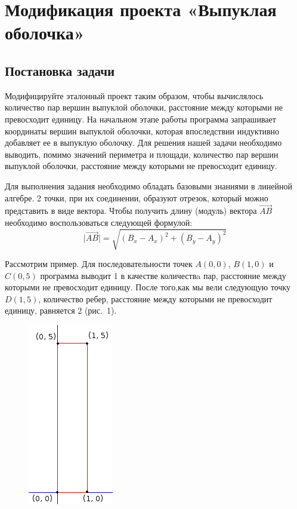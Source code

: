 \section{Модификация проекта «Выпуклая оболочка»}

\subsection{Постановка задачи}

Модифицируйте эталонный проект таким образом, чтобы вычислялось количество пар вершин выпуклой оболочки, расстояние между которыми не превосходит единицу.
На начальном этапе работы программа запрашивает координаты вершин выпуклой оболочки, которая впоследствии индуктивно добавляет ее в выпуклую оболочку. Для решения нашей задачи необходимо выводить, помимо значений периметра и площади, количество пар вершин выпуклой оболочки, расстояние между которыми не превосходит единицу.

Для выполнения задания необходимо обладать базовыми знаниями в линейной алгебре. 2 точки, при их соединении, образуют отрезок, который можно представить в виде вектора. Чтобы получить длину (модуль) вектора $\overrightarrow{AB}$ необходимо воспользоваться следующей формулой:
$$\mid \overrightarrow{AB} \mid = \sqrt{(B_{x}-A_{x})^2+(B_{y}-A_{y})^2}$$  

Рассмотрим пример. Для последовательности точек $A(0, 0)$, $B(1, 0)$ и $C(0, 5)$ программа
выводит 1 в качестве количествa пар, расстояние между которыми не превосходит единицу.
После того,как мы вели  следующую точку $D(1, 5)$, количество ребер, расстояние между которыми не превосходит единицу, равняется $2$ (рис.~1).

\begin{figure}[ht!]
\begin{center}
\includegraphics[scale=0.7]{images/picture1}
\end{center}
\end{figure}
\newpage

